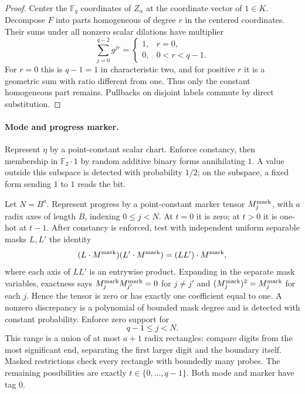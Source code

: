 \begin{proof}
Center the $\mathbb F_q$ coordinates of $Z_\alpha$ at the coordinate
vector of $1\in K$.  Decompose $F$ into parts homogeneous of degree
$r$ in the centered coordinates.  Their sums under all nonzero
scalar dilations have multiplier
\[
 \sum_{j=0}^{q-2}g^{jr}
   =\begin{cases}1,&r=0,\\0,&0<r<q-1.\end{cases}
\]
For $r=0$ this is $q-1=1$ in characteristic two, and for positive
$r$ it is a geometric sum with ratio different from one.  Thus
only the constant homogeneous part remains.  Pullbacks on disjoint
labels commute by direct substitution.
\end{proof}

\paragraph{Mode and progress marker.}
Represent $\eta$ by a point-constant scalar chart.  Enforce constancy,
then membership in $\mathbb F_2\cdot1$ by random additive binary
forms annihilating $1$.  A value outside this subspace is detected
with probability $1/2$; on the subspace, a fixed form sending $1$
to $1$ reads the bit.

Let $N=B^a$.  Represent progress by a point-constant marker tensor
$M^{\rm mark}_j$, with $a$ radix axes of length $B$, indexing
$0\le j<N$.  At $t=0$ it is zero; at $t>0$ it is one-hot at $t-1$.
After constancy is enforced, test with independent uniform separable
masks $L,L'$ the identity
\begin{equation}
 (L\cdot M^{\rm mark})(L'\cdot M^{\rm mark})
                  =(LL')\cdot M^{\rm mark},       \label{ia:marker-identity}
\end{equation}
where each axis of $LL'$ is an entrywise product.  Expanding in the
separate mask variables, exactness says
$M_j^{\rm mark}M_{j'}^{\rm mark}=0$ for $j\ne j'$ and
$(M_j^{\rm mark})^2=M_j^{\rm mark}$ for each $j$.  Hence the tensor
is zero or has exactly one coefficient equal to one.  A nonzero
discrepancy is a polynomial of bounded mask degree and is detected
with constant probability.  Enforce zero support for
\begin{equation}
 q-1\le j<N.                                      \label{ia:marker-padding}
\end{equation}
This range is a union of at most $a+1$ radix rectangles: compare
digits from the most significant end, separating the first larger
digit and the boundary itself.  Masked restrictions check every
rectangle with boundedly many probes.  The remaining possibilities
are exactly $t\in\{0,\ldots,q-1\}$.  Both mode and marker have
tag $0$.

